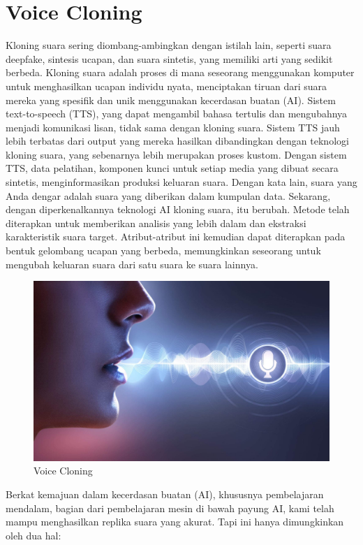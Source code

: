 \section{Voice Cloning}
Kloning suara sering diombang-ambingkan dengan istilah lain, seperti suara deepfake, sintesis ucapan, dan suara sintetis, yang memiliki arti yang sedikit berbeda. Kloning suara adalah proses di mana seseorang menggunakan komputer untuk menghasilkan ucapan individu nyata, menciptakan tiruan dari suara mereka yang spesifik dan unik menggunakan kecerdasan buatan (AI). Sistem text-to-speech (TTS), yang dapat mengambil bahasa tertulis dan mengubahnya menjadi komunikasi lisan, tidak sama dengan kloning suara. Sistem TTS jauh lebih terbatas dari output yang mereka hasilkan dibandingkan dengan teknologi kloning suara, yang sebenarnya lebih merupakan proses kustom. Dengan sistem TTS, data pelatihan, komponen kunci untuk setiap media yang dibuat secara sintetis, menginformasikan produksi keluaran suara. Dengan kata lain, suara yang Anda dengar adalah suara yang diberikan dalam kumpulan data. Sekarang, dengan diperkenalkannya teknologi AI kloning suara, itu berubah. Metode telah diterapkan untuk memberikan analisis yang lebih dalam dan ekstraksi karakteristik suara target. Atribut-atribut ini kemudian dapat diterapkan pada bentuk gelombang ucapan yang berbeda, memungkinkan seseorang untuk mengubah keluaran suara dari satu suara ke suara lainnya.

\begin{figure}[H]
        \centerline{\includegraphics[scale=.15]{figures/voicecloning}}
        \caption{Voice Cloning}
		\label{voicecloning}
\end{figure}

Berkat kemajuan dalam kecerdasan buatan (AI), khususnya pembelajaran mendalam, bagian dari pembelajaran mesin di bawah payung AI, kami telah mampu menghasilkan replika suara yang akurat. Tapi ini hanya dimungkinkan oleh dua hal:

